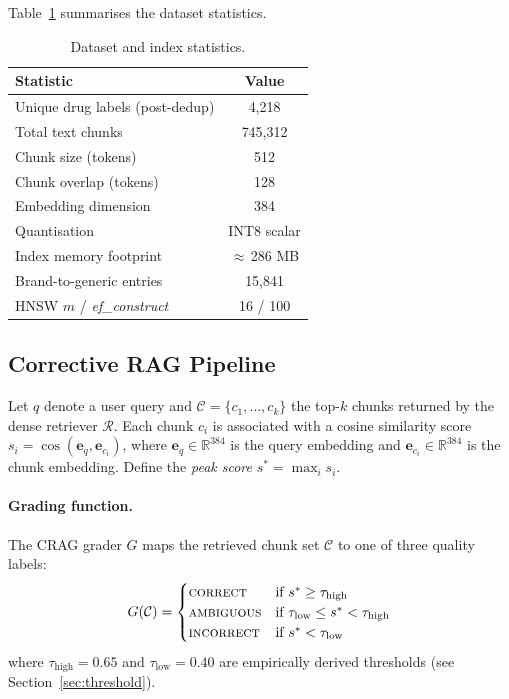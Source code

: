 \documentclass[10pt, twocolumn]{article}
\begin{document}
Table~\ref{tab:dataset} summarises the dataset statistics.

\begin{table}[H]
  \centering
  \caption{Dataset and index statistics.}
  \label{tab:dataset}
  \begin{tabular}{@{}lc@{}}
    \toprule
    \textbf{Statistic}                  & \textbf{Value}   \\
    \midrule
    Unique drug labels (post-dedup)     & 4,218            \\
    Total text chunks                   & 745,312          \\
    Chunk size (tokens)                 & 512              \\
    Chunk overlap (tokens)              & 128              \\
    Embedding dimension                 & 384              \\
    Quantisation                        & INT8 scalar      \\
    Index memory footprint              & $\approx$\,286 MB\\
    Brand-to-generic entries            & 15,841           \\
    HNSW $m$ / \textit{ef\_construct}   & 16 / 100         \\
    \bottomrule
  \end{tabular}
\end{table}

\subsection{Corrective RAG Pipeline}
\label{sec:crag}

Let $q$ denote a user query and $\mathcal{C} = \{c_1, \dots, c_k\}$
the top-$k$ chunks returned by the dense retriever $\mathcal{R}$.
Each chunk $c_i$ is associated with a cosine similarity score $s_i =
\cos(\mathbf{e}_q, \mathbf{e}_{c_i})$, where $\mathbf{e}_q \in
\mathbb{R}^{384}$ is the query embedding and $\mathbf{e}_{c_i} \in
\mathbb{R}^{384}$ is the chunk embedding.  Define the \emph{peak score}
$s^{*} = \max_{i} s_i$.

\paragraph{Grading function.}
The CRAG grader $G$ maps the retrieved chunk set $\mathcal{C}$ to one
of three quality labels:
\begin{equation}
  G(\mathcal{C}) =
  \begin{cases}
    \textsc{correct}   & \text{if } s^{*} \geq \tau_{\text{high}} \\
    \textsc{ambiguous} & \text{if } \tau_{\text{low}} \leq s^{*} < \tau_{\text{high}} \\
    \textsc{incorrect} & \text{if } s^{*} < \tau_{\text{low}}
  \end{cases}
  \label{eq:grader}
\end{equation}
where $\tau_{\text{high}} = 0.65$ and $\tau_{\text{low}} = 0.40$ are
empirically derived thresholds (see Section~\ref{sec:threshold}).
\end{document}
